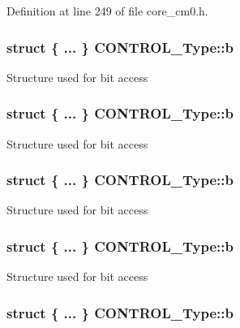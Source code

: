 Definition at line 249 of file core\-\_\-cm0.\-h.

\hypertarget{union_c_o_n_t_r_o_l___type_aa62abc89b024d8037a1b1ffe596b0d2b}{
\subsubsection[{b}]{\setlength{\rightskip}{0pt plus 5cm}struct \{ ... \}   C\-O\-N\-T\-R\-O\-L\-\_\-\-Type\-::b}}\label{union_c_o_n_t_r_o_l___type_aa62abc89b024d8037a1b1ffe596b0d2b}
Structure used for bit access \hypertarget{union_c_o_n_t_r_o_l___type_ab883f95a669dec8350524b535b2ac942}{
\subsubsection[{b}]{\setlength{\rightskip}{0pt plus 5cm}struct \{ ... \}   C\-O\-N\-T\-R\-O\-L\-\_\-\-Type\-::b}}\label{union_c_o_n_t_r_o_l___type_ab883f95a669dec8350524b535b2ac942}
Structure used for bit access \hypertarget{union_c_o_n_t_r_o_l___type_a4e61a86f33ae70b0716f7f728bd7967b}{
\subsubsection[{b}]{\setlength{\rightskip}{0pt plus 5cm}struct \{ ... \}   C\-O\-N\-T\-R\-O\-L\-\_\-\-Type\-::b}}\label{union_c_o_n_t_r_o_l___type_a4e61a86f33ae70b0716f7f728bd7967b}
Structure used for bit access \hypertarget{union_c_o_n_t_r_o_l___type_a6f413ce37232bfcb69220e3ce24254d4}{
\subsubsection[{b}]{\setlength{\rightskip}{0pt plus 5cm}struct \{ ... \}   C\-O\-N\-T\-R\-O\-L\-\_\-\-Type\-::b}}\label{union_c_o_n_t_r_o_l___type_a6f413ce37232bfcb69220e3ce24254d4}
Structure used for bit access \hypertarget{union_c_o_n_t_r_o_l___type_acd7a110a4bf4ced749284df57ce2600c}{
\subsubsection[{b}]{\setlength{\rightskip}{0pt plus 5cm}struct \{ ... \}   C\-O\-N\-T\-R\-O\-L\-\_\-\-Type\-::b}}\label{union_c_o_n_t_r_o_l___type_acd7a110a4bf4ced749284df57ce2600c}
